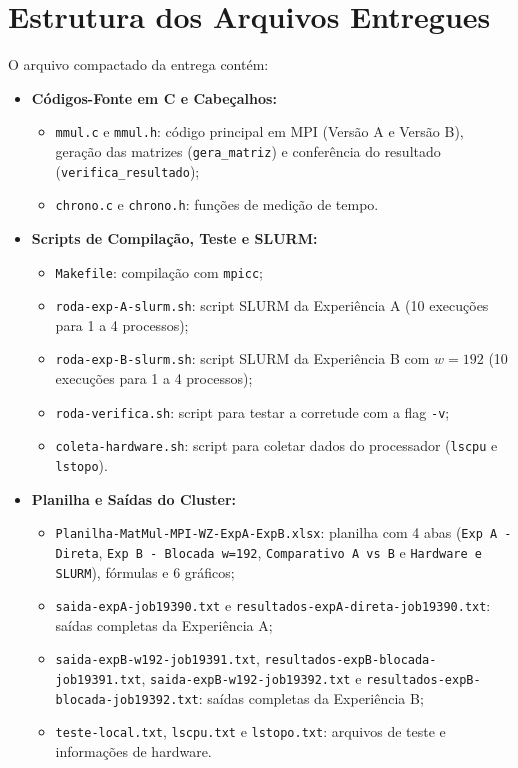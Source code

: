 \documentclass[12pt, a4paper, twoside, chapter=TITLE, subsection=TITLE, section=TITLE, subsubsection=TITLE, english, brazil]{abntex2}
\begin{document}
\section{Estrutura dos Arquivos Entregues}
O arquivo compactado da entrega contém:

\begin{itemize}
    \item \textbf{Códigos-Fonte em C e Cabeçalhos:}
    \begin{itemize}
        \item \nolinkurl{mmul.c} e \nolinkurl{mmul.h}: código principal em MPI (Versão A e Versão B), geração das matrizes (\nolinkurl{gera_matriz}) e conferência do resultado (\nolinkurl{verifica_resultado});
        \item \nolinkurl{chrono.c} e \nolinkurl{chrono.h}: funções de medição de tempo.
    \end{itemize}

    \item \textbf{Scripts de Compilação, Teste e SLURM:}
    \begin{itemize}
        \item \nolinkurl{Makefile}: compilação com \texttt{mpicc};
        \item \nolinkurl{roda-exp-A-slurm.sh}: script SLURM da Experiência A (10 execuções para 1 a 4 processos);
        \item \nolinkurl{roda-exp-B-slurm.sh}: script SLURM da Experiência B com $w = 192$ (10 execuções para 1 a 4 processos);
        \item \nolinkurl{roda-verifica.sh}: script para testar a corretude com a flag \texttt{-v};
        \item \nolinkurl{coleta-hardware.sh}: script para coletar dados do processador (\texttt{lscpu} e \texttt{lstopo}).
    \end{itemize}

    \item \textbf{Planilha e Saídas do Cluster:}
    \begin{itemize}
        \item \nolinkurl{Planilha-MatMul-MPI-WZ-ExpA-ExpB.xlsx}: planilha com 4 abas (\texttt{Exp A - Direta}, \texttt{Exp B - Blocada w=192}, \texttt{Comparativo A vs B} e \texttt{Hardware e SLURM}), fórmulas e 6 gráficos;
        \item \nolinkurl{saida-expA-job19390.txt} e \nolinkurl{resultados-expA-direta-job19390.txt}: saídas completas da Experiência A;
        \item \nolinkurl{saida-expB-w192-job19391.txt}, \nolinkurl{resultados-expB-blocada-job19391.txt}, \nolinkurl{saida-expB-w192-job19392.txt} e \nolinkurl{resultados-expB-blocada-job19392.txt}: saídas completas da Experiência B;
        \item \nolinkurl{teste-local.txt}, \nolinkurl{lscpu.txt} e \nolinkurl{lstopo.txt}: arquivos de teste e informações de hardware.
    \end{itemize}


\end{itemize}
\end{document}
